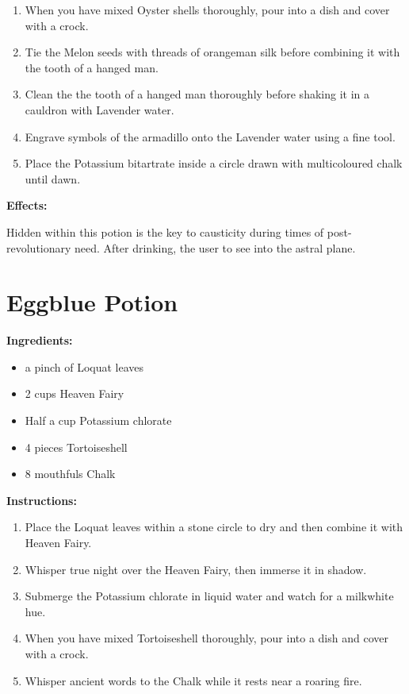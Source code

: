 \documentclass{article}
\begin{document}
\begin{enumerate}
  \item When you have mixed Oyster shells thoroughly, pour into a dish and cover with a crock.
  \item Tie the Melon seeds with threads of orangeman silk before combining it with the tooth of a hanged man.
  \item Clean the the tooth of a hanged man thoroughly before shaking it in a cauldron with Lavender water.
  \item Engrave symbols of the armadillo onto the Lavender water using a fine tool.
  \item Place the Potassium bitartrate inside a circle drawn with multicoloured chalk until dawn.
\end{enumerate}

\textbf{Effects:}

Hidden within this potion is the key to causticity during times of post-revolutionary need. After drinking, the user to see into the astral plane.

\newpage
\section*{Eggblue Potion}

\textbf{Ingredients:}

\begin{itemize}
  \item a pinch of Loquat leaves
  \item 2 cups Heaven Fairy
  \item Half a cup Potassium chlorate
  \item 4 pieces Tortoiseshell
  \item 8 mouthfuls Chalk
\end{itemize}

\textbf{Instructions:}

\begin{enumerate}
  \item Place the Loquat leaves within a stone circle to dry and then combine it with Heaven Fairy.
  \item Whisper true night over the Heaven Fairy, then immerse it in shadow.
  \item Submerge the Potassium chlorate in liquid water and watch for a milkwhite hue.
  \item When you have mixed Tortoiseshell thoroughly, pour into a dish and cover with a crock.
  \item Whisper ancient words to the Chalk while it rests near a roaring fire.
\end{enumerate}
\end{document}
